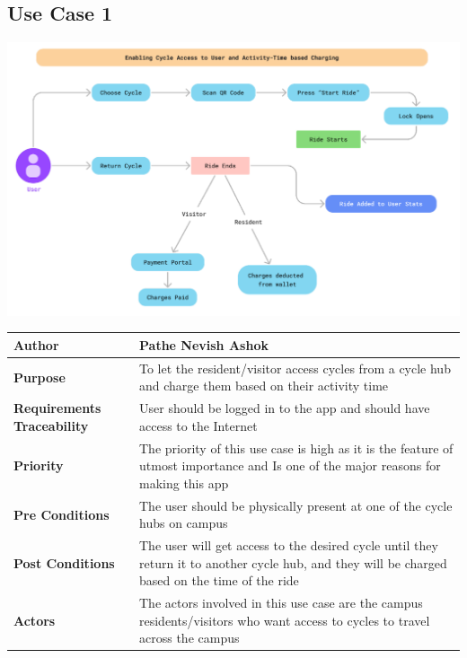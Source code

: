 \documentclass{scrreprt}
\begin{document}
\subsection{Use Case 1}
\begin{center}
\includegraphics*[scale=0.6]{usecase-1.png}\\
\vspace{5mm}
\begin{tabular}{|l|p{10cm}|}
    \hline
    \textbf{Author} & Pathe Nevish Ashok \\
    \hline
    \textbf{Purpose} & To let the resident/visitor access cycles from a cycle hub and charge them based on their activity time \\
    \hline
    \textbf{Requirements Traceability} &User should be logged in to the app and should have access to the Internet \\
    \hline
    \textbf{Priority} &The priority of this use case is high as it is the feature of utmost  importance and Is one of the major reasons for making this app \\
    \hline
    \textbf{Pre Conditions} &The user should be physically present at one of the cycle hubs on campus \\
    \hline
    \textbf{Post Conditions} & The user will get access to the desired cycle until they return it to another cycle hub, and they will be charged based on the time of the ride\\
    \hline
    \textbf{Actors} & The actors involved in this use case are the campus residents/visitors who want access to cycles to travel across the campus\\
    \hline
\end{tabular}
\end{center}
\newpage
\end{document}
